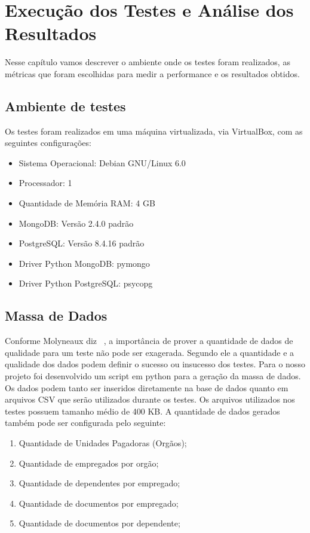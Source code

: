 \chapter {Execução dos Testes e Análise dos Resultados}

Nesse capítulo vamos descrever o ambiente onde os testes foram realizados, as métricas que foram escolhidas para medir a performance e os resultados obtidos.

\section{Ambiente de testes}

Os testes foram realizados em uma máquina virtualizada, via VirtualBox, com as seguintes configurações:

\begin{itemize}
\item Sistema Operacional: Debian GNU/Linux 6.0
\item Processador: 1 
\item Quantidade de Memória RAM: 4 GB
\item MongoDB: Versão 2.4.0 padrão
\item PostgreSQL: Versão 8.4.16 padrão
\item Driver Python MongoDB: pymongo
\item Driver Python PostgreSQL: psycopg
\end{itemize}

\section{Massa de Dados}

Conforme Molyneaux diz ~\cite{theartoftestperf}, a importância de prover a quantidade de dados de qualidade para um teste não pode ser exagerada. Segundo ele a quantidade e a qualidade dos dados podem definir o sucesso ou insucesso dos testes. Para o nosso projeto foi desenvolvido um script em python para a geração da massa de dados. Os dados podem tanto ser inseridos diretamente na base de dados quanto em arquivos CSV que serão utilizados durante os testes. Os arquivos utilizados nos testes possuem tamanho médio de 400 KB. A quantidade de dados gerados também pode ser configurada pelo seguinte:

\begin{enumerate}
	\item Quantidade de Unidades Pagadoras (Orgãos);
	\item Quantidade de empregados por orgão;
	\item Quantidade de dependentes por empregado;
	\item Quantidade de documentos por empregado;
	\item Quantidade de documentos por dependente;
\end{enumerate}

